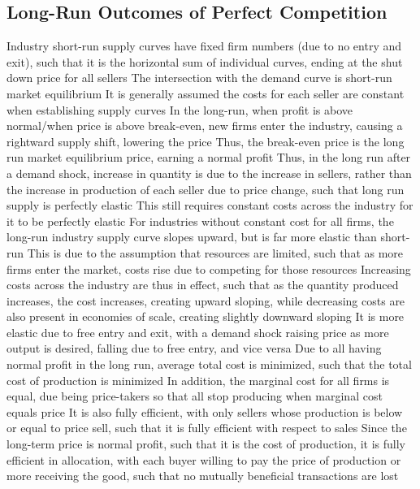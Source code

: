 \documentclass[11 pt, twoside]{article}
\newenvironment{outline*}
{
	\begin{outline}[enumerate]
	}
	{\end{outline}
}
\begin{document}
\subsection{Long-Run Outcomes of Perfect Competition}
\begin{outline*}
\1 Industry short-run supply curves have fixed firm numbers (due to no entry and exit), such that it is the horizontal sum of individual curves, ending at the shut down price for all sellers
\2 The intersection with the demand curve is short-run market equilibrium
\2 It is generally assumed the costs for each seller are constant when establishing supply curves
\1 In the long-run, when profit is above normal/when price is above break-even, new firms enter the industry, causing a rightward supply shift, lowering the price
\2 Thus, the break-even price is the long run market equilibrium price, earning a normal profit
\2 Thus, in the long run after a demand shock, increase in quantity is due to the increase in sellers, rather than the increase in production of each seller due to price change, such that long run supply is perfectly elastic
\2 This still requires constant costs across the industry for it to be perfectly elastic
\1 For industries without constant cost for all firms, the long-run industry supply curve slopes upward, but is far more elastic than short-run
\2 This is due to the assumption that resources are limited, such that as more firms enter the market, costs rise due to competing for those resources
\2 Increasing costs across the industry are thus in effect, such that as the quantity produced increases, the cost increases, creating upward sloping, while decreasing costs are also present in economies of scale, creating slightly downward sloping
\2 It is more elastic due to free entry and exit, with a demand shock raising price as more output is desired, falling due to free entry, and vice versa
\1 Due to all having normal profit in the long run, average total cost is minimized, such that the total cost of production is minimized
\2 In addition, the marginal cost for all firms is equal, due being price-takers so that all stop producing when marginal cost equals price
\2 It is also fully efficient, with only sellers whose production is below or equal to price sell, such that it is fully efficient with respect to sales
\3 Since the long-term price is normal profit, such that it is the cost of production, it is fully efficient in allocation, with each buyer willing to pay the price of production or more receiving the good, such that no mutually beneficial transactions are lost
\end{outline*}
\end{document}
